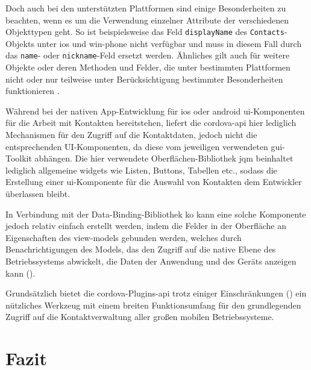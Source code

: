 Doch auch bei den unterstützten Plattformen sind einige Besonderheiten zu beachten, wenn es um die Verwendung einzelner Attribute der verschiedenen Objekttypen geht.
So ist beispielsweise das Feld \lstinline|displayName| des \lstinline|Contacts|-Objekts unter \gls{ios} und \gls{win-phone} nicht verfügbar und muss in diesem Fall durch das \lstinline|name|- oder \lstinline|nickname|-Feld ersetzt werden. %
Ähnliches gilt auch für weitere Objekte oder deren Methoden und Felder, die unter bestimmten Plattformen nicht oder nur teilweise unter Berücksichtigung bestimmter Besonderheiten funktionieren \cite{Cordova_Plugin_Registry_Contacts}.

Während bei der nativen App-Entwicklung für \gls{ios} oder \gls{android} \gls{ui}-Komponenten für die Arbeit mit Kontakten bereitstehen, liefert die \gls{cordova}-\gls{api} hier lediglich Mechanismen für den Zugriff auf die Kontaktdaten, jedoch nicht die entsprechenden UI-Komponenten, da diese vom jeweiligen verwendeten \gls{gui}-Toolkit abhängen.
Die hier verwendete Oberflächen-Bibliothek \gls{jqm} beinhaltet lediglich allgemeine \glspl{widget} wie Listen, Buttons, Tabellen etc., sodass die Erstellung einer \gls{ui}-Komponente für die Auswahl von Kontakten dem Entwickler überlassen bleibt.

In Verbindung mit der Data-Binding-Bibliothek \gls{ko} kann eine solche Komponente jedoch relativ einfach erstellt werden, indem die Felder in der Oberfläche an Eigenschaften des \glspl{view-model} gebunden werden, welches durch Benachrichtigungen des Models, das den Zugriff auf die native Ebene des Betriebssystems abwickelt, die Daten der Anwendung und des Geräts anzeigen kann ().

Grundsätzlich bietet die \gls{cordova}-Plugins-\gls{api} trotz einiger Einschränkungen (\so) ein nützliches Werkzeug mit einem breiten Funktionsumfang für den grundlegenden Zugriff auf die Kontaktverwaltung aller großen mobilen Betriebssysteme.



	\section{Fazit} %

